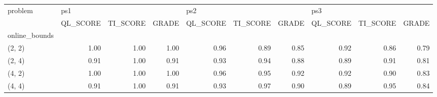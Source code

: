 \begin{tabular}{lrrrrrrrrr}
\toprule
problem & \multicolumn{3}{l}{ps1} & \multicolumn{3}{l}{ps2} & \multicolumn{3}{l}{ps3} \\
{} & QL\_SCORE & TI\_SCORE & GRADE & QL\_SCORE & TI\_SCORE & GRADE & QL\_SCORE & TI\_SCORE & GRADE \\
online\_bounds &          &          &       &          &          &       &          &          &       \\
\midrule
(2, 2)        &     1.00 &     1.00 &  1.00 &     0.96 &     0.89 &  0.85 &     0.92 &     0.86 &  0.79 \\
(2, 4)        &     0.91 &     1.00 &  0.91 &     0.93 &     0.94 &  0.88 &     0.89 &     0.91 &  0.81 \\
(4, 2)        &     1.00 &     1.00 &  1.00 &     0.96 &     0.95 &  0.92 &     0.92 &     0.90 &  0.83 \\
(4, 4)        &     0.91 &     1.00 &  0.91 &     0.93 &     0.97 &  0.90 &     0.89 &     0.95 &  0.84 \\
\bottomrule
\end{tabular}
